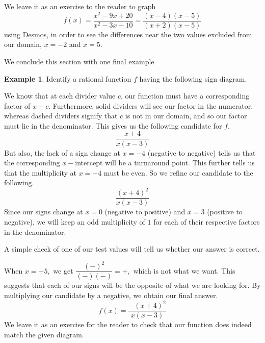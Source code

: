 \documentclass[12pt]{book}
\theoremstyle{definition}
\newtheorem{example}{Example}
\newcommand{\Desmos}{\href{https://www.desmos.com/}{Desmos}}
\begin{document}
We leave it as an exercise to the reader to graph $$f(x)=\dfrac{x^2-9x+20}{x^2-3x-10}=\dfrac{(x-4)(x-5)}{(x+2)(x-5)}$$ 
using \Desmos, in order to see the differences near the two values excluded from our domain, $x=-2$ and $x=5$.
\par
We conclude this section with one final example
\begin{example}\label{sign_diag_4}
Identify a rational function $f$ having the following sign diagram.
\begin{center}
\end{center}
We know that at each divider value $c$, our function must have a corresponding factor of $x-c$.  Furthermore, solid dividers will see our factor in the numerator, whereas dashed dividers signify that $c$ is not in our domain, and so our factor must lie in the denominator.  This gives us the following candidate for $f$.
$$\dfrac{x+4}{x(x-3)}$$
But also, the lack of a sign change at $x=-4$ (negative to negative) tells us that the corresponding $x-$intercept will be a turnaround point. This further tells us that the multiplicity at $x=-4$ must be even.  So we refine our candidate to the following.
$$\dfrac{(x+4)^2}{x(x-3)}$$
Since our signs change at $x=0$ (negative to positive) and $x=3$ (positive to negative), we will keep an odd multiplicity of $1$ for each of their respective factors in the denominator.
\par
A simple check of one of our test values will tell us whether our answer is correct.
\par
When $x=-5,$ we get $\dfrac{(-)^2}{(-)(-)}=+,$ which is not what we want.  This suggests that each of our signs will be the opposite of what we are looking for.  By multiplying our candidate by a negative, we obtain our final answer.
$$f(x)=\dfrac{-(x+4)^2}{x(x-3)}$$
We leave it as an exercise for the reader to check that our function does indeed match the given diagram.
\end{example}
\end{document}
